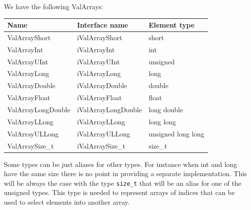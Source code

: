 \documentclass[12pt,a4paper,openany]{memoir} %
\begin{document}
{{We have the following ValArrays:
\begin{center}
\begin{tabular}{l|l|l}
\hline
\textbf{Name}&\textbf{Interface name}&\textbf{Element type}\\ \hline
ValArrayShort&iValArrayShort&short\\ \hline
ValArrayInt&iValArrayInt&int\\ \hline
ValArrayUInt&iValArrayUInt&unsigned\\ \hline
ValArrayLong&iValArrayLong&long\\ \hline
ValArrayDouble&iValArrayDouble&double\\ \hline
ValArrayFloat&iValArrayFloat&float\\ \hline
ValArrayLongDouble&iValArrayLongDouble&long double\\ \hline
ValArrayLLong&iValArrayLLong&long long\\ \hline
ValArrayULLong&iValArrayULLong&unsigned long long\\ \hline
ValArraySize\_t&iValArraySize\_t&size\_t\\ \hline
\end{tabular}
\end{center}
Some types can be just aliases for other types. For instance when int and long have the same size there is no point in providing a separate
implementation. This will be always the case with the type \verb,size_t, that will be an alias for one of the unsigned types. This type is needed to
represent arrays of indices that can be used to select elements into another array.

}}
\end{document}
